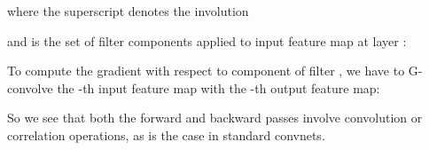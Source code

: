 \documentclass{article}
\begin{document}
where the superscript  denotes the involution 

and  is the set of filter components applied to input feature map  at layer :


To compute the gradient with respect to component  of filter , we have to G-convolve the -th input feature map with the -th output feature map:


So we see that both the forward and backward passes involve convolution or correlation operations, as is the case in standard convnets.
\end{document}
